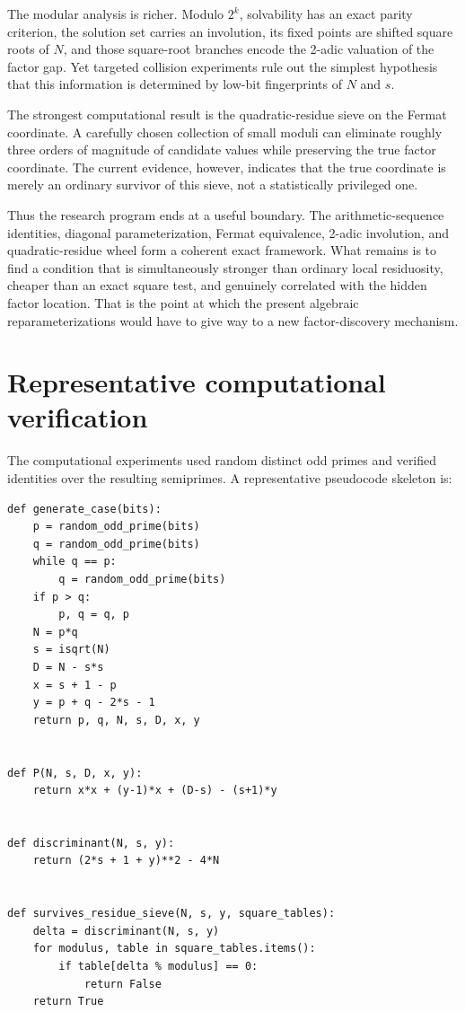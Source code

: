 \documentclass[11pt,a4paper]{article}
\begin{document}
The modular analysis is richer. Modulo \(2^k\), solvability has an exact parity criterion, the solution set carries an involution, its fixed points are shifted square roots of \(N\), and those square-root branches encode the 2-adic valuation of the factor gap. Yet targeted collision experiments rule out the simplest hypothesis that this information is determined by low-bit fingerprints of \(N\) and \(s\).

The strongest computational result is the quadratic-residue sieve on the Fermat coordinate. A carefully chosen collection of small moduli can eliminate roughly three orders of magnitude of candidate values while preserving the true factor coordinate. The current evidence, however, indicates that the true coordinate is merely an ordinary survivor of this sieve, not a statistically privileged one.

Thus the research program ends at a useful boundary. The arithmetic-sequence identities, diagonal parameterization, Fermat equivalence, 2-adic involution, and quadratic-residue wheel form a coherent exact framework. What remains is to find a condition that is simultaneously stronger than ordinary local residuosity, cheaper than an exact square test, and genuinely correlated with the hidden factor location. That is the point at which the present algebraic reparameterizations would have to give way to a new factor-discovery mechanism.

\appendix
\section{Representative computational verification}
\label{app:verification}

The computational experiments used random distinct odd primes and verified identities over the resulting semiprimes. A representative pseudocode skeleton is:

\begin{lstlisting}
def generate_case(bits):
    p = random_odd_prime(bits)
    q = random_odd_prime(bits)
    while q == p:
        q = random_odd_prime(bits)
    if p > q:
        p, q = q, p
    N = p*q
    s = isqrt(N)
    D = N - s*s
    x = s + 1 - p
    y = p + q - 2*s - 1
    return p, q, N, s, D, x, y


def P(N, s, D, x, y):
    return x*x + (y-1)*x + (D-s) - (s+1)*y


def discriminant(N, s, y):
    return (2*s + 1 + y)**2 - 4*N


def survives_residue_sieve(N, s, y, square_tables):
    delta = discriminant(N, s, y)
    for modulus, table in square_tables.items():
        if table[delta % modulus] == 0:
            return False
    return True
\end{lstlisting}
\end{document}
